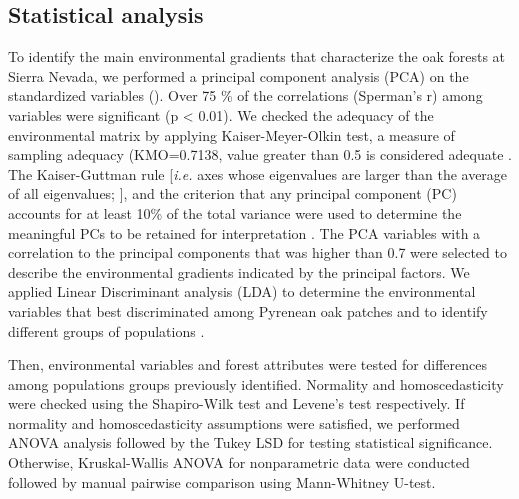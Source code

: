 \subsection{Statistical analysis}\label{sec:multivar:Analysis}
To identify the main environmental gradients that characterize the oak forests at Sierra Nevada, we performed a principal component analysis (PCA) on the standardized variables (). Over 75 \% of the correlations (Sperman's r) among variables were significant (p \textless{} 0.01). We checked the adequacy of the environmental matrix by applying Kaiser-Meyer-Olkin test, a measure of sampling adequacy (KMO=0.7138, value greater than 0.5 is considered adequate \autocite{DziubanShirkey1974WhenCorrelation}. The Kaiser-Guttman rule {[}\emph{i.e.} axes whose eigenvalues are larger than the average of all eigenvalues; \textcite{Guttman1954NecessaryConditions}{]}, and the criterion that any principal component (PC) accounts for at least 10\% of the total variance were used to determine the meaningful PCs to be retained for interpretation \autocite{LegendreLegendre2012NumericalEcology}. The PCA variables with a correlation to the principal components that was higher than 0.7 were selected to describe the environmental gradients indicated by the principal factors. We applied Linear Discriminant analysis (LDA) to determine the environmental variables that best discriminated among Pyrenean oak patches and to identify different groups of populations \autocite{Williams1983ObservationsUse,LegendreLegendre2012NumericalEcology}.

Then, environmental variables and forest attributes were tested for differences among populations groups previously identified. Normality and homoscedasticity were checked using the Shapiro-Wilk test and Levene's test respectively. If normality and homoscedasticity assumptions were satisfied, we performed ANOVA analysis followed by the Tukey LSD for testing statistical significance. Otherwise, Kruskal-Wallis ANOVA for nonparametric data were conducted followed by manual pairwise comparison using Mann-Whitney U-test.

